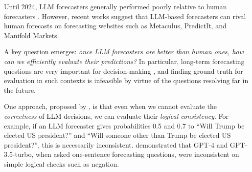 Until 2024, LLM forecasters generally performed poorly relative to human forecasters \citep{zouForecastingFutureWorld2022, schoeneggerLargeLanguageModel2023}.
However, recent works \citep{halawiApproachingHumanLevelForecasting2024, schoeneggerWisdomSiliconCrowd2024,safeai2024forecasters} suggest that LLM-based forecasters can rival human forecasts on forecasting websites such as Metaculus, PredictIt, and Manifold Markets.

A key question emerges: \emph{once LLM forecasters are better than human ones, how can we efficiently evaluate their predictions?}
In particular, long-term forecasting questions are very important for decision-making \citep{tetlock2024longrange, lukemuehlhauserHowFeasibleLongrange2019}, and finding ground truth for evaluation in such contexts is infeasible by virtue of the questions resolving far in the future.

One approach, proposed by \citet{esmwcc}, is that even when we cannot evaluate the \emph{correctness} of LLM decisions, we can evaluate their \emph{logical consistency}.
For example, if an LLM forecaster gives probabilities 0.5 and 0.7 to ``Will Trump be elected US president?'' and ``Will someone other than Trump be elected US president?'', this is necessarily inconsistent.
\citet{esmwcc} demonstrated that GPT-4 and GPT-3.5-turbo, when asked one-sentence forecasting questions, were inconsistent on simple logical checks such as negation.



